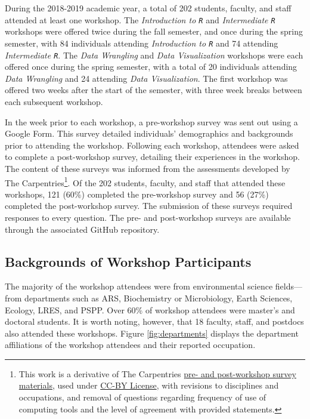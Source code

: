 \documentclass[12pt]{article}
\newcommand{\R}{\texttt{R}}
\begin{document}
\noindent During the 2018-2019 academic year, a total of 202 students, faculty,
and staff attended at least one workshop. The \emph{Introduction to \R} and
\emph{Intermediate \R} workshops were offered twice during the fall semester,
and once during the spring semester, with 84 individuals attending 
\emph{Introduction to \R} and 74 attending \emph{Intermediate \R}. The 
\emph{Data Wrangling} and \emph{Data Visualization} workshops were each offered
once during the spring semester, with a total of 20 individuals attending 
\emph{Data Wrangling} and 24 attending \emph{Data Visualization}. The first
workshop was offered two weeks after the start of the semester, with three week
breaks between each subsequent workshop. 

\enlargethispage{0.25in}

\quad In the week prior to each workshop, a pre-workshop survey was
sent out using a Google Form. This survey detailed individuals' demographics and
backgrounds prior to attending the workshop. Following each workshop, attendees
were asked to complete a post-workshop survey, detailing their experiences in
the workshop.  The content of these surveys was informed from the assessments 
developed by The Carpentries\footnote{This work is a
derivative of The Carpentries \href{https://carpentries.org/assessment/}{pre-
and post-workshop survey materials}, used under 
\href{https://creativecommons.org/licenses/by/4.0/}{CC-BY License}, with
revisions to disciplines and occupations, and removal of questions regarding
frequency of use of computing tools and the level of agreement with provided
statements.}. Of the 202 students, faculty, and staff that attended these
workshops, 121 (60\%) completed the pre-workshop survey and 56 (27\%) completed
the post-workshop survey. The submission of these surveys required responses to
every question. The pre- and post-workshop surveys are available through the 
associated GitHub repository.  


\subsection{Backgrounds of Workshop Participants}

\noindent The majority of the workshop attendees were from environmental science
fields---from departments such as ARS, Biochemistry or
Microbiology, Earth Sciences, Ecology, LRES, and PSPP. Over 60\% of workshop 
attendees were master's and doctoral students. It is worth noting, however, that
18 faculty, staff, and postdocs also attended these workshops. Figure 
\ref{fig:departments} displays the department affiliations of the workshop
attendees and their reported occupation. 
\end{document}
